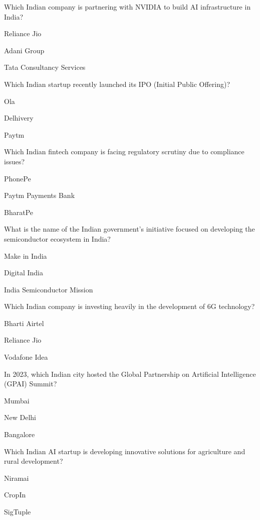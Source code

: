 
\begin{enhancedmcq}{Which Indian company is partnering with NVIDIA to build AI infrastructure in India?}
\item Reliance Jio
\item Adani Group
\item Tata Consultancy Services

\end{enhancedmcq}
\begin{enhancedmcq}{Which Indian startup recently launched its IPO (Initial Public Offering)?}
\item Ola
\item Delhivery
\item Paytm

\end{enhancedmcq}
\begin{enhancedmcq}{Which Indian fintech company is facing regulatory scrutiny due to compliance issues?}
\item PhonePe
\item Paytm Payments Bank
\item BharatPe

\end{enhancedmcq}
\begin{enhancedmcq}{What is the name of the Indian government's initiative focused on developing the semiconductor ecosystem in India?}
\item Make in India
\item Digital India
\item India Semiconductor Mission

\end{enhancedmcq}
\begin{enhancedmcq}{Which Indian company is investing heavily in the development of 6G technology?}
\item Bharti Airtel
\item Reliance Jio
\item Vodafone Idea

\end{enhancedmcq}
\begin{enhancedmcq}{In 2023, which Indian city hosted the Global Partnership on Artificial Intelligence (GPAI) Summit?}
\item Mumbai
\item New Delhi
\item Bangalore

\end{enhancedmcq}
\begin{enhancedmcq}{Which Indian AI startup is developing innovative solutions for agriculture and rural development?}
\item Niramai
\item CropIn
\item SigTuple

\end{enhancedmcq}

